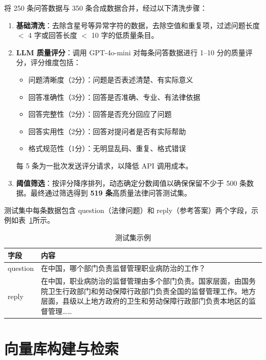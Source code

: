 \documentclass[12pt, a4paper]{article}
\begin{document}
将 250 条问答数据与 350 条合成数据合并，经过以下清洗步骤：

\begin{enumerate}[leftmargin=2em]
    \item \textbf{基础清洗}：去除含星号等异常字符的数据，去除空值和重复项，过滤问题长度 $<$ 4 字或回答长度 $<$ 10 字的低质量条目。

    \item \textbf{LLM 质量评分}：调用 GPT-4o-mini 对每条问答数据进行 1--10 分的质量评分，评分维度包括：
    \begin{itemize}[leftmargin=1.5em]
        \item 问题清晰度（2分）：问题是否表述清楚、有实际意义
        \item 回答准确性（3分）：回答是否准确、专业、有法律依据
        \item 回答完整性（2分）：回答是否充分回应了问题
        \item 回答实用性（2分）：回答对提问者是否有实际帮助
        \item 格式规范性（1分）：无明显乱码、重复、格式错误
    \end{itemize}
    每 5 条为一批次发送评分请求，以降低 API 调用成本。

    \item \textbf{阈值筛选}：按评分降序排列，动态确定分数阈值以确保保留不少于 500 条数据。最终通过筛选得到 \textbf{519 条}高质量法律问答测试集。
\end{enumerate}

测试集中每条数据包含 question（法律问题）和 reply（参考答案）两个字段，示例如表~\ref{tab:testset_example}所示。

\begin{table}[H]
\centering
\caption{测试集示例}
\label{tab:testset_example}
\begin{tabular}{p{4cm}p{9cm}}
\toprule
\textbf{字段} & \textbf{内容} \\
\midrule
question & 在中国，哪个部门负责监督管理职业病防治的工作？ \\
\midrule
reply & 在中国，职业病防治的监督管理由多个部门负责。国家层面，由国务院卫生行政部门和劳动保障行政部门负责全国的监督管理工作。地方层面，县级以上地方政府的卫生和劳动保障行政部门负责本地区的监督管理…… \\
\bottomrule
\end{tabular}
\end{table}

\section{向量库构建与检索}
\end{document}
